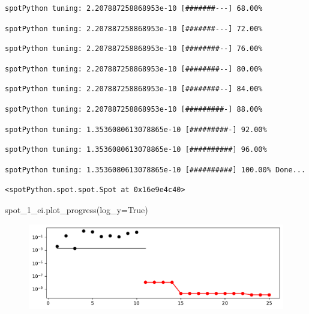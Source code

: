\documentclass[
  letterpaper,
  DIV=11,
  numbers=noendperiod]{scrreprt}
\newenvironment{Shaded}{\begin{snugshade}}{\end{snugshade}}
\newcommand{\NormalTok}[1]{\textcolor[rgb]{0.00,0.23,0.31}{#1}}
\newcommand{\OperatorTok}[1]{\textcolor[rgb]{0.37,0.37,0.37}{#1}}
\newcommand{\VariableTok}[1]{\textcolor[rgb]{0.07,0.07,0.07}{#1}}
\begin{document}
\begin{verbatim}
spotPython tuning: 2.207887258868953e-10 [#######---] 68.00% 
\end{verbatim}

\begin{verbatim}
spotPython tuning: 2.207887258868953e-10 [#######---] 72.00% 
\end{verbatim}

\begin{verbatim}
spotPython tuning: 2.207887258868953e-10 [########--] 76.00% 
\end{verbatim}

\begin{verbatim}
spotPython tuning: 2.207887258868953e-10 [########--] 80.00% 
\end{verbatim}

\begin{verbatim}
spotPython tuning: 2.207887258868953e-10 [########--] 84.00% 
\end{verbatim}

\begin{verbatim}
spotPython tuning: 2.207887258868953e-10 [#########-] 88.00% 
\end{verbatim}

\begin{verbatim}
spotPython tuning: 1.3536080613078865e-10 [#########-] 92.00% 
\end{verbatim}

\begin{verbatim}
spotPython tuning: 1.3536080613078865e-10 [##########] 96.00% 
\end{verbatim}

\begin{verbatim}
spotPython tuning: 1.3536080613078865e-10 [##########] 100.00% Done...
\end{verbatim}

\begin{verbatim}
<spotPython.spot.spot.Spot at 0x16e9e4c40>
\end{verbatim}

\begin{Shaded}
\begin{Highlighting}[]
\NormalTok{spot\_1\_ei.plot\_progress(log\_y}\OperatorTok{=}\VariableTok{True}\NormalTok{)}
\end{Highlighting}
\end{Shaded}

\begin{figure}[H]

{\centering \includegraphics{07_spot_ei_files/figure-pdf/cell-11-output-1.pdf}

}

\end{figure}
\end{document}
